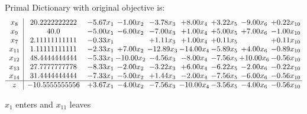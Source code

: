 \documentclass[8pt]{article}
\begin{document}
Primal Dictionary with original objective is:
\[\begin{array}{c| c c@{\hskip 2pt} c@{\hskip 2pt} c@{\hskip 2pt} c@{\hskip 2pt} c@{\hskip 2pt} c@{\hskip 2pt} c@{\hskip 2pt} }
 x_{8}   &  20.2222222222 & -5.67 x_{1} & -1.00 x_{2} & -3.78 x_{3} & +  8.00 x_{4} & +  3.22 x_{5} & -9.00 x_{6} & +  0.22 x_{10}\\
 x_{9}   &  40.0 & -5.00 x_{1} & -6.00 x_{2} & -7.00 x_{3} & +  1.00 x_{4} & +  5.00 x_{5} & +  7.00 x_{6} & -1.00 x_{10}\\
 x_{7}   &  2.11111111111 & -0.33 x_{1} &   & +  1.11 x_{3} & +  1.00 x_{4} & +  0.11 x_{5} &   & +  0.11 x_{10}\\
 x_{11}   &  1.11111111111 & -2.33 x_{1} & +  7.00 x_{2} & -12.89 x_{3} & -14.00 x_{4} & -5.89 x_{5} & +  4.00 x_{6} & -0.89 x_{10}\\
 x_{12}   &  48.4444444444 & -5.33 x_{1} & -10.00 x_{2} & -4.56 x_{3} & -8.00 x_{4} & -7.56 x_{5} & + 10.00 x_{6} & -0.56 x_{10}\\
 x_{13}   &  27.7777777778 & -8.33 x_{1} & -2.00 x_{2} & -3.22 x_{3} & +  6.00 x_{4} & -6.22 x_{5} & -2.00 x_{6} & -0.22 x_{10}\\
 x_{14}   &  31.4444444444 & -7.33 x_{1} & -5.00 x_{2} & +  1.44 x_{3} & -2.00 x_{4} & -7.56 x_{5} & -6.00 x_{6} & -0.56 x_{10}\\
\hline
z    &  -10.5555555556 & +  3.67 x_{1} & -4.00 x_{2} & -7.56 x_{3} & -10.00 x_{4} & -3.56 x_{5} & -4.00 x_{6} & -0.56 x_{10}\\
\end{array}\]


 $ x_{1} $ enters and $ x_{11} $ leaves 
\end{document}
